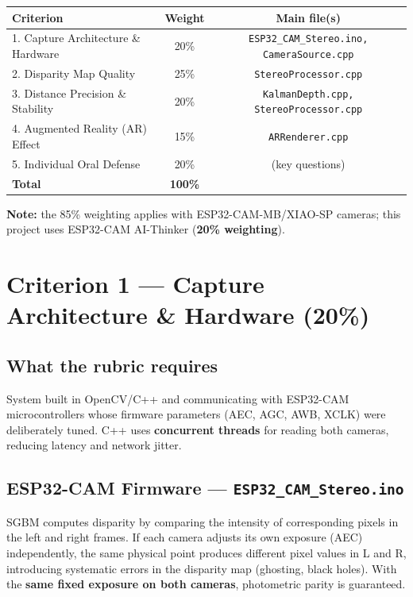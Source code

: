 \documentclass[11pt,a4paper]{article}
\begin{document}
\vspace{4pt}
\begin{center}
\begin{tabular}{lcc}
\toprule
\textbf{Criterion} & \textbf{Weight} & \textbf{Main file(s)} \\
\midrule
1. Capture Architecture \& Hardware & 20\% & \texttt{ESP32\_CAM\_Stereo.ino, CameraSource.cpp} \\
2. Disparity Map Quality            & 25\% & \texttt{StereoProcessor.cpp} \\
3. Distance Precision \& Stability  & 20\% & \texttt{KalmanDepth.cpp, StereoProcessor.cpp} \\
4. Augmented Reality (AR) Effect    & 15\% & \texttt{ARRenderer.cpp} \\
5. Individual Oral Defense          & 20\% & (key questions) \\
\midrule
\textbf{Total} & \textbf{100\%} & \\
\bottomrule
\end{tabular}
\end{center}

\vspace{4pt}
\noindent\textbf{Note:} the 85\% weighting applies with ESP32-CAM-MB/XIAO-SP cameras;
this project uses ESP32-CAM AI-Thinker (\textbf{20\% weighting}).

\section{Criterion 1 --- Capture Architecture \& Hardware (20\%)}

\subsection*{What the rubric requires}
System built in OpenCV/C++ and communicating with ESP32-CAM microcontrollers whose
firmware parameters (AEC, AGC, AWB, XCLK) were deliberately tuned. C++ uses
\textbf{concurrent threads} for reading both cameras, reducing latency and network jitter.

\subsection*{ESP32-CAM Firmware --- \texttt{ESP32\_CAM\_Stereo.ino}}

\begin{critbox}[frametitle={Why AEC / AGC / AWB = OFF}]
SGBM computes disparity by comparing the intensity of corresponding pixels in the
left and right frames. If each camera adjusts its own exposure (AEC) independently,
the same physical point produces different pixel values in L and R, introducing
systematic errors in the disparity map (ghosting, black holes).
With the \textbf{same fixed exposure on both cameras}, photometric parity is guaranteed.
\end{critbox}
\end{document}
